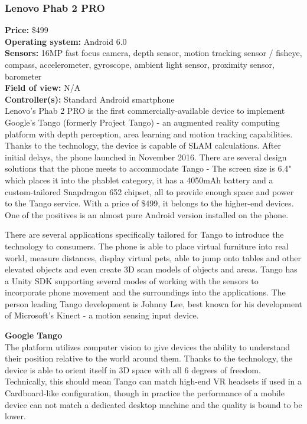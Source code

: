 \documentclass[12pt, a4paper]{article}
\begin{document}
\subsubsection{Lenovo Phab 2 PRO}
\vspace*{-5mm}
\textbf{Price:} \$499\\
\textbf{Operating system:} Android 6.0\\
\textbf{Sensors:} 16MP fast focus camera, depth sensor, motion tracking sensor / fisheye, compass, accelerometer, gyroscope, ambient light sensor, proximity sensor, barometer\\
\textbf{Field of view:} N/A \\
\textbf{Controller(s):} Standard Android smartphone \bigskip \\
Lenovo’s Phab 2 PRO is the first commercially-available device to implement Google’s Tango (formerly Project Tango) - an augmented reality computing platform with depth perception, area learning and motion tracking capabilities. Thanks to the technology, the device is capable of SLAM calculations. After initial delays, the phone launched in November 2016. There are several design solutions that the phone meets to accommodate Tango - The screen size is 6.4" which places it into the phablet category, it has a 4050mAh battery and a custom-tailored Snapdragon 652 chipset, all to provide enough space and power to the Tango service. With a price of \$499, it belongs to the higher-end devices. One of the positives is an almost pure Android version installed on the phone.

There are several applications specifically tailored for Tango to introduce the technology to consumers. The phone is able to place virtual furniture into real world, measure distances, display virtual pets, able to jump onto tables and other elevated objects and even create 3D scan models of objects and areas. Tango has a Unity SDK supporting several modes of working with the sensors to incorporate phone movement and the surroundings into the applications. The person leading Tango development is Johnny Lee, best known for his development of Microsoft’s Kinect - a motion sensing input device.

\textbf{Google Tango}\\
The platform utilizes computer vision to give devices the ability to understand their position relative to the world around them. Thanks to the technology, the device is able to orient itself in 3D space with all 6 degrees of freedom. Technically, this should mean Tango can match high-end VR headsets if used in a Cardboard-like configuration, though in practice the performance of a mobile device can not match a dedicated desktop machine and the quality is bound to be lower.
\end{document}
